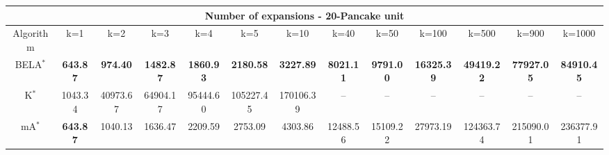 \begin{tabular}{c|cccccccccccc}\toprule
\multicolumn{13}{c}{Number of expansions - 20-Pancake unit}\\ \midrule
Algorithm & k=1 & k=2 & k=3 & k=4 & k=5 & k=10 & k=40 & k=50 & k=100 & k=500 & k=900 & k=1000 \\ \midrule
BELA$^*$ & \textbf{643.87} & \textbf{974.40} & \textbf{1482.87} & \textbf{1860.93} & \textbf{2180.58} & \textbf{3227.89} & \textbf{8021.11} & \textbf{9791.00} & \textbf{16325.39} & \textbf{49419.22} & \textbf{77927.05} & \textbf{84910.45} \\
K$^*$ & 1043.34 & 40973.67 & 64904.17 & 95444.60 & 105227.45 & 170106.39 & -- & -- & -- & -- & -- & -- \\
mA$^*$ & \textbf{643.87} & 1040.13 & 1636.47 & 2209.59 & 2753.09 & 4303.86 & 12488.56 & 15109.22 & 27973.19 & 124363.74 & 215090.01 & 236377.91 \\ \bottomrule 
\end{tabular}
